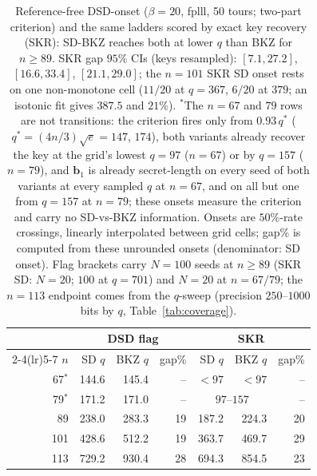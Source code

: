 \documentclass[journal=cic,version=preprint]{iacrj}
\begin{document}
\begin{table}[tbp]
\centering
\caption{Reference-free DSD-onset ($\beta=20$, fplll, 50 tours; two-part criterion) and the same ladders scored by exact key recovery (SKR): SD-BKZ reaches both at lower $q$ than BKZ for $n\ge89$. SKR gap $95\%$ CIs (keys resampled): $[7.1,27.2]$, $[16.6,33.4]$, $[21.1,29.0]$; the $n=101$ SKR SD onset rests on one non-monotone cell ($11/20$ at $q=367$, $6/20$ at $379$; an isotonic fit gives $387.5$ and $21\%$). $^\ast$The $n=67$ and $79$ rows are not transitions: the criterion fires only from $0.93\,q^\ast$ ($q^\ast=(4n/3)\sqrt{e}=147$, $174$), both variants already recover the key at the grid's lowest $q=97$ ($n=67$) or by $q=157$ ($n=79$), and $\mathbf b_1$ is already secret-length on every seed of both variants at every sampled $q$ at $n=67$, and on all but one from $q=157$ at $n=79$; these onsets measure the criterion and carry no SD-vs-BKZ information. Onsets are $50\%$-rate crossings, linearly interpolated between grid cells; gap\% is computed from these unrounded onsets (denominator: SD onset). Flag brackets carry $N=100$ seeds at $n\ge89$ (SKR SD: $N=20$; $100$ at $q=701$) and $N=20$ at $n=67/79$; the $n=113$ endpoint comes from the $q$-sweep (precision $250$--$1000$ bits by $q$, Table~\ref{tab:coverage}).\label{tab:dsdgap}}
\begin{tabular}{rrrrrrr}
\toprule
 & \multicolumn{3}{c}{DSD flag} & \multicolumn{3}{c}{SKR} \\
\cmidrule(lr){2-4}\cmidrule(lr){5-7}
$n$ & SD $q$ & BKZ $q$ & gap\% & SD $q$ & BKZ $q$ & gap\% \\
\midrule
67$^\ast$  & 144.6 & 145.4 & -- & $<97$ & $<97$ & -- \\
79$^\ast$  & 171.2 & 171.0 & -- & \multicolumn{2}{c}{$97$--$157$} & -- \\
89  & 238.0 & 283.3 & 19 & 187.2 & 224.3 & 20 \\
101 & 428.6 & 512.2 & 19 & 363.7 & 469.7 & 29 \\
113 & 729.2 & 930.4 & 28 & 694.3 & 854.5 & 23 \\
\bottomrule
\end{tabular}
\end{table}
\end{document}
